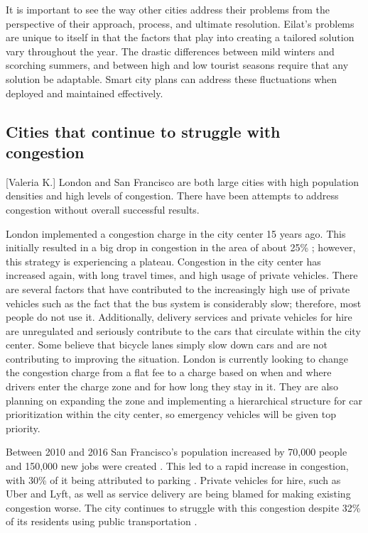 \documentclass[12pt]{article}                               %
\begin{document}
It is important to see the way other cities address their problems from the perspective of their approach, process, and ultimate resolution. Eilat's problems are unique to itself in that the factors that play into creating a tailored solution vary throughout the year. The drastic differences between mild winters and scorching summers, and between high and low tourist seasons require that any solution be adaptable. Smart city plans can address these fluctuations when deployed and maintained effectively.

\subsection{Cities that continue to struggle with congestion}[Valeria K.]
London and San Francisco are both large cities with high population densities and high levels of congestion. There have been attempts to address congestion without overall successful results. 

London implemented a congestion charge in the city center 15 years ago. This initially resulted in a big drop in congestion in the area of about 25\% \cite{Badstuber2018LondonIt}; however, this strategy is experiencing a plateau. Congestion in the city center has increased again, with long travel times, and high usage of private vehicles. There are several factors that have contributed to the increasingly high use of private vehicles such as the fact that the bus system is considerably slow; therefore, most people do not use it. Additionally, delivery services and private vehicles for hire are unregulated and seriously contribute to the cars that circulate within the city center. Some believe that bicycle lanes simply slow down cars and are not contributing to improving the situation. London is currently looking to change the congestion charge from a flat fee to a charge based on when and where drivers enter the charge zone and for how long they stay in it. They are also planning on expanding the zone and implementing a hierarchical structure for car prioritization within the city center, so emergency vehicles will be given top priority. 

Between 2010 and 2016 San Francisco's population increased by 70,000 people and 150,000 new jobs were created \cite{Marshall2018UberComplicated}. This led to a rapid increase in congestion, with 30\% of it being attributed to parking \cite{Marshall2018UberComplicated}. Private vehicles for hire, such as Uber and Lyft, as well as service delivery are being blamed for making existing congestion worse. The city continues to struggle with this congestion despite 32\% of its residents using public transportation \cite{Marshall2018UberComplicated}. 
\end{document}
